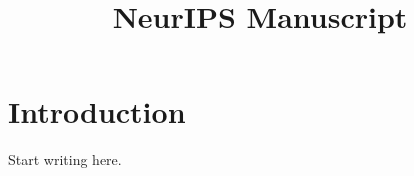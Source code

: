 \documentclass{article}
\title{NeurIPS Manuscript}
\author{}
\date{}
\begin{document}
\maketitle
\section{Introduction}
Start writing here.


\end{document}
